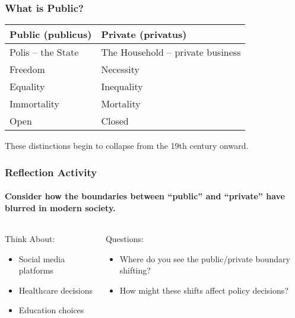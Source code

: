 \documentclass[10pt]{beamer}
\begin{document}
\begin{frame}
\frametitle{What is Public?}

\begin{table}
\centering
\begin{tabular}{|l|l|}
\hline
\textbf{Public (publicus)} & \textbf{Private (privatus)} \\
\hline
\pause
Polis -- the State & The Household -- private business \\
\hline
\pause
Freedom & Necessity \\
\hline
\pause
Equality & Inequality \\
\hline
\pause
Immortality & Mortality \\
\hline
\pause
Open & Closed \\
\hline
\end{tabular}
\end{table}

\vspace{1cm}
\pause
\centering
These distinctions begin to collapse from the 19th century onward.

\end{frame}

\begin{frame}
\frametitle{Reflection Activity}
\framesubtitle{Consider how the boundaries between ``public'' and ``private'' have blurred in modern society.}

\begin{columns}
\begin{column}{0.48\textwidth}
\begin{block}{Think About:}
\begin{itemize}
\item Social media platforms
\item Healthcare decisions
\item Education choices
\end{itemize}
\end{block}
\end{column}

\begin{column}{0.48\textwidth}
\begin{block}{Questions:}
\begin{itemize}
\item Where do you see the public/private boundary shifting?
\item How might these shifts affect policy decisions?
\end{itemize}
\end{block}
\end{column}
\end{columns}

\end{frame}
\end{document}
